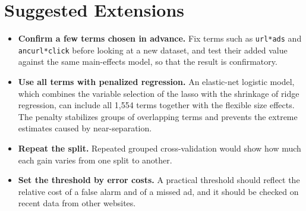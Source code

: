 \section{Suggested Extensions}
\begin{itemize}
\item \textbf{Confirm a few terms chosen in advance.} Fix terms such as
  \texttt{url*ads} and \texttt{ancurl*click} before looking at a new dataset,
  and test their added value against the same main-effects model, so that
  the result is confirmatory.
\item \textbf{Use all terms with penalized regression.} An elastic-net
  logistic model, which combines the variable selection of the lasso with the
  shrinkage of ridge regression, can include all 1,554 terms together with
  the flexible size effects. The penalty stabilizes groups of overlapping
  terms and prevents the extreme estimates caused by near-separation.
\item \textbf{Repeat the split.} Repeated grouped cross-validation would show
  how much each gain varies from one split to another.
\item \textbf{Set the threshold by error costs.} A practical threshold should
  reflect the relative cost of a false alarm and of a missed ad, and it
  should be checked on recent data from other websites.
\end{itemize}
